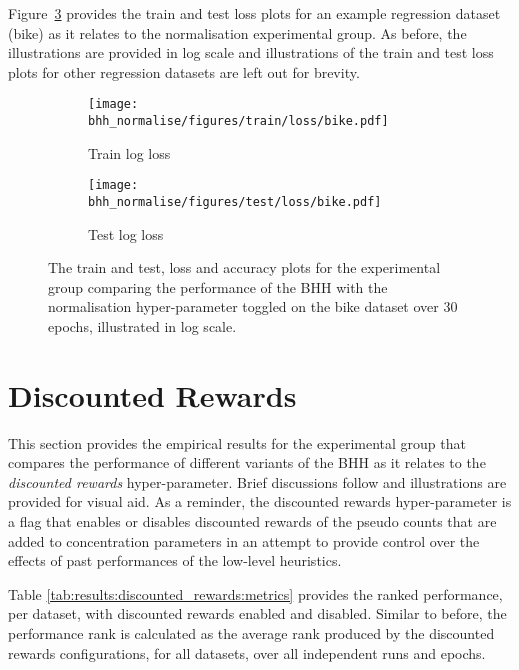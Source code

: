 Figure~\ref{fig:results:normalise:figures:bike} provides the train and test loss plots for an example regression dataset (bike) as it relates to the normalisation experimental group. As before, the illustrations are provided in log scale and illustrations of the train and test loss plots for other regression datasets are left out for brevity.


\begin{figure}[htb]
	\begin{subfigure}{0.5\textwidth}
		\centering
		\texttt{[image: bhh\_normalise/figures/train/loss/bike.pdf]}
		\caption{Train log loss}
		\label{fig:results:normalise:figures:loss:train:bike}
	\end{subfigure}
	\begin{subfigure}{0.5\textwidth}
		\centering
		\texttt{[image: bhh\_normalise/figures/test/loss/bike.pdf]}
		\caption{Test log loss}
		\label{fig:results:normalise:figures:loss:test:bike}
	\end{subfigure}
	\par\bigskip
	\caption{The train and test, loss and accuracy plots for the experimental group comparing the performance of the \acs{BHH} with the normalisation hyper-parameter toggled on the bike dataset over 30 epochs, illustrated in log scale.}
	\label{fig:results:normalise:figures:bike}
\end{figure}



\section{Discounted Rewards}\label{sec:results:discounted_rewards}

This section provides the empirical results for the experimental group that compares the performance of different variants of the \acs{BHH} as it relates to the \textit{discounted rewards} hyper-parameter. Brief discussions follow and illustrations are provided for visual aid. As a reminder, the discounted rewards hyper-parameter is a flag that enables or disables discounted rewards of the pseudo counts that are added to concentration parameters in an attempt to provide control over the effects of past performances of the low-level heuristics.

Table \ref{tab:results:discounted_rewards:metrics} provides the ranked performance, per dataset, with discounted rewards enabled and disabled. Similar to before, the performance rank is calculated as the average rank produced by the discounted rewards configurations, for all datasets, over all independent runs and epochs.

